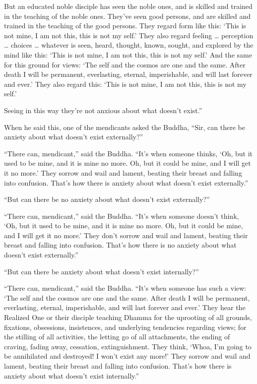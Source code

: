 \documentclass[12pt,openany]{book}%
\begin{document}
But an educated noble disciple has seen the noble ones, and is skilled and trained in the teaching of the noble ones. They’ve seen good persons, and are skilled and trained in the teaching of the good persons. They regard form like this: ‘This is not mine, I am not this, this is not my self.’ They also regard feeling … perception … choices … whatever is seen, heard, thought, known, sought, and explored by the mind like this: ‘This is not mine, I am not this, this is not my self.’ And the same for this ground for views: ‘The self and the cosmos are one and the same. After death I will be permanent, everlasting, eternal, imperishable, and will last forever and ever.’ They also regard this: ‘This is not mine, I am not this, this is not my self.’ 

Seeing in this way they’re not anxious about what doesn’t exist.” 

When he said this, one of the mendicants asked the Buddha, “Sir, can there be anxiety about what doesn’t exist externally?” 

“There can, mendicant,” said the Buddha. “It’s when someone thinks, ‘Oh, but it used to be mine, and it is mine no more. Oh, but it could be mine, and I will get it no more.’ They sorrow and wail and lament, beating their breast and falling into confusion. That’s how there is anxiety about what doesn’t exist externally.” 

“But can there be no anxiety about what doesn’t exist externally?” 

“There can, mendicant,” said the Buddha. “It’s when someone doesn’t think, ‘Oh, but it used to be mine, and it is mine no more. Oh, but it could be mine, and I will get it no more.’ They don’t sorrow and wail and lament, beating their breast and falling into confusion. That’s how there is no anxiety about what doesn’t exist externally.” 

“But can there be anxiety about what doesn’t exist internally?” 

“There can, mendicant,” said the Buddha. “It’s when someone has such a view: ‘The self and the cosmos are one and the same. After death I will be permanent, everlasting, eternal, imperishable, and will last forever and ever.’ They hear the Realized One or their disciple teaching Dhamma for the uprooting of all grounds, fixations, obsessions, insistences, and underlying tendencies regarding views; for the stilling of all activities, the letting go of all attachments, the ending of craving, fading away, cessation, extinguishment. They think, ‘Whoa, I’m going to be annihilated and destroyed! I won’t exist any more!’ They sorrow and wail and lament, beating their breast and falling into confusion. That’s how there is anxiety about what doesn’t exist internally.” 
\end{document}
